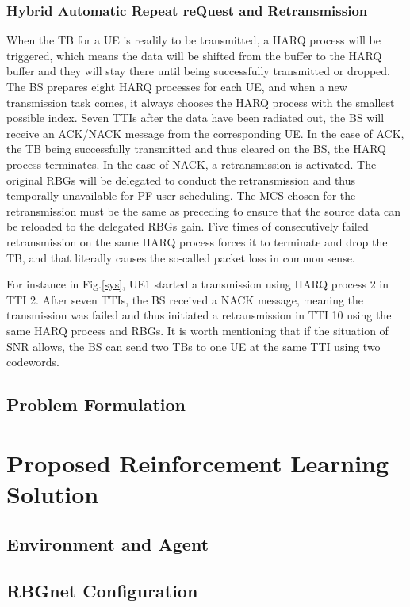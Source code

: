 \documentclass[conference,compsocconf]{IEEEtran}
\begin{document}
\subsubsection{Hybrid Automatic Repeat reQuest and Retransmission}
When the TB for a UE is readily to be transmitted, a HARQ process will be triggered, which means the data will be shifted from the buffer to the HARQ buffer and they will stay there until being successfully transmitted or dropped. The  BS prepares eight HARQ processes for each UE, and when a new transmission task comes, it always chooses the HARQ process with the smallest possible index. Seven TTIs after the data have been radiated out, the BS will receive an ACK/NACK message from the corresponding UE. In the case of ACK, the TB being successfully transmitted and thus cleared on the BS, the HARQ process terminates. In the case of NACK, a retransmission is activated. The original RBGs will be delegated to conduct the retransmission and thus temporally unavailable for PF user scheduling. The MCS chosen for the retransmission must be the same as preceding to ensure that the source data can be reloaded to the delegated RBGs gain. Five times of consecutively failed retransmission on the same HARQ process forces it to terminate and drop the TB, and that literally causes the so-called packet loss in common sense.

For instance in Fig.\ref{sys}, UE1 started a transmission using HARQ	process 2 in TTI 2. After seven TTIs, the BS received a NACK message, meaning the transmission was failed and thus initiated a retransmission in TTI 10 using the same HARQ process and RBGs.
It is worth mentioning that if the situation of SNR allows, the BS can send two TBs to one UE at the same TTI using two codewords.

\subsection{Problem Formulation}

\section{Proposed Reinforcement Learning Solution}

\subsection{Environment and Agent}

\subsection{RBGnet Configuration}
\end{document}
